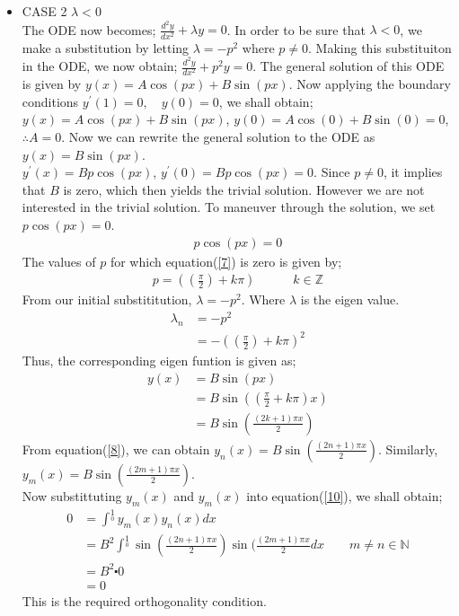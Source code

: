 \documentclass[12pt,a4paper]{article}
\newcommand{\N}{\mathbb{N}}
\newcommand{\Z}{\mathbb{Z}}
\begin{document}
\begin{itemize}
\begin{itemize}
	\item CASE 2 $\lambda <0$\\
	The ODE now becomes; $\frac{d^{2}y}{dx^{2}}+\lambda y=0$. In order to be sure that $\lambda<0$, we make a substitution by letting $\lambda=-p^{2}$ where $p \neq 0$. Making this substituiton in the ODE, we now obtain; $\frac{d^{2}y}{dx^{2}}+p^{2}y=0$. The general solution of this ODE is given by $y(x)=A \cos(px)+B \sin(px)$. Now applying the boundary conditions $y^{\prime}(1)=0 ,\quad  y(0)=0$, we shall obtain;\\
	$y(x)=A \cos(px)+B \sin(px)$, $y(0)=A \cos(0)+B \sin(0)=0$, $\therefore A=0$. Now we can rewrite the general solution to the ODE as $y(x)=B \sin(px)$.\\
	$y^{\prime}(x)=Bp \cos(px)$, $y^{\prime}(0)=Bp \cos(px)=0$. Since $p \neq 0$, it implies that $B$ is zero, which then yields the trivial solution. However we are not interested in the trivial solution. To maneuver through the solution, we set $p \cos(px)=0$.
	\begin{align}
	p\cos(px)=0 \label{7}
	\end{align}
	The values of $p$ for which equation(\ref{7}) is zero is given by;
	\begin{align*}
	p=((\frac{\pi}{2})+k \pi) \quad \quad \quad k \in \Z
	\end{align*}
	From our initial substititution, $\lambda=-p^{2}$. Where $\lambda$ is the eigen value.
	\begin{align*}
	\lambda _{n}&=-p^{2}\\
	&=-((\frac{\pi}{2})+k \pi)^{2}
	\end{align*} 
Thus, the corresponding eigen funtion is given as;\\
\begin{align}
y(x)&=B \sin(px)\\
&=B \sin ((\frac{\pi}{2}+k \pi)x) \\
&=B \sin (\frac{(2k+1)\pi x}{2})\label{8}
\end{align}	
From equation(\ref{8}), we can obtain $y_{n}(x)=B \sin (\frac{(2n+1)\pi x}{2})$. Similarly,$y_{m}(x)=B \sin (\frac{(2m+1)\pi x}{2})$.\\
Now substittuting $y_{m}(x)$ and $y_{m}(x)$ into equation(\ref{10}), we shall obtain;\\
\begin{align*}
0&=\int^{1}\limits_{0}y_{m}(x)y_{n}(x)dx\\
&=B^{2}\int^{1}\limits_{0}\sin (\frac{(2n+1)\pi x}{2})\sin (\frac{(2m+1)\pi x}{2}dx \quad \quad m \neq n  \in \N\\
&=B^{2}\centerdot0\\
&=0
\end{align*}
This is the required orthogonality condition.
\end{itemize}
\end{itemize}
\end{document}
